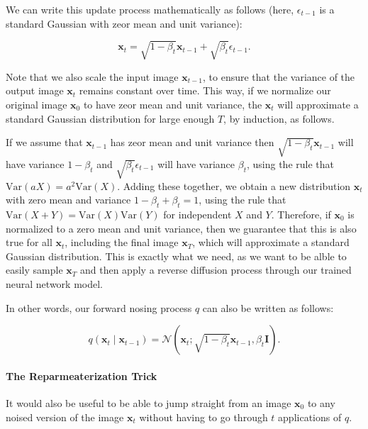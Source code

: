 We can write this update process mathematically as follows (here, \( \epsilon_{t-1} \) is a standard Gaussian with zeor mean and unit variance):

\[
	\mathbf{x}_t = \sqrt{1 - \beta_t}  \mathbf{x}_{t-1} + \sqrt{\beta_t} \epsilon_{t-1}
	.\]

Note that we also scale the input image \( \mathbf{x}_{t-1}\), to ensure that the variance of the output image \( \mathbf{x}_t \) remains constant over time.
This way, if we normalize our original image \( \mathbf{x}_0 \) to have zeor mean and unit variance, the \( \mathbf{x}_t \) will approximate a standard Gaussian distribution for large enough \( T \), by induction, as follows.

If we assume that \( \mathbf{x}_{t-1} \) has zeor mean and unit variance then \( \sqrt{1 - \beta_t} \mathbf{x}_{t-1} \)  will have variance \( 1- \beta _t \) and \( \sqrt{\beta _t} \epsilon_{t-1}  \) will have variance \( \beta _t \), using the rule that \( \mathrm{Var}\left(aX\right) = a^2 \mathrm{Var}\left(X\right) \).
Adding these together, we obtain a new distribution \( \mathbf{x}_t \) with zero mean and variance \( 1- \beta _t + \beta _t =  1\), using the rule that \( \mathrm{Var}\left(X+Y\right) = \mathrm{Var}\left(X\right) \mathrm{Var}\left(Y\right)\) for independent \( X \) and \( Y \).
Therefore, if \( \mathbf{x}_0 \) is normalized to a zero mean and unit variance, then we guarantee that this is also true for  all \( \mathbf{x}_t \), including the final image \( \mathbf{x}_T \), which will approximate a standard Gaussian distribution.
This is exactly what we need, as we want to be alble to easily sample \( \mathbf{x}_T \) and then apply a reverse diffusion process through our trained neural network model.

In other words, our forward nosing process \( q \) can also be written as follows:

\[
	q(\mathbf{x}_t  \mid  \mathbf{x}_{t-1}) = \mathcal{N}(\mathbf{x}_t; \sqrt{1- \beta _t} \mathbf{x}_{t-1}, \beta _t \mathbf{I})
	.\]

\paragraph{The Reparmeaterization Trick}

It would also be useful to be able to jump straight from an image \( \mathbf{x}_0 \) to any noised version of the image \(  \mathbf{x}_t\) without having to go through \( t \) applications of \( q \).


